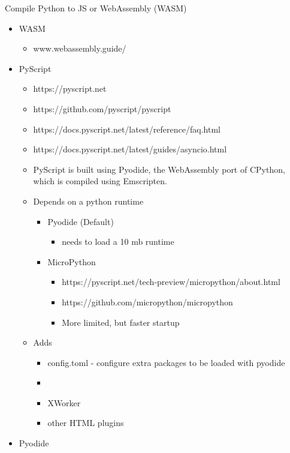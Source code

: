 Compile Python to JS or WebAssembly (WASM)

\begin{itemize}
\item
  WASM

  \begin{itemize}
  \tightlist
  \item
    www.webassembly.guide/
  \end{itemize}
\item
  PyScript

  \begin{itemize}
  \tightlist
  \item
    https://pyscript.net
  \item
    https://github.com/pyscript/pyscript
  \item
    https://docs.pyscript.net/latest/reference/faq.html
  \item
    https://docs.pyscript.net/latest/guides/asyncio.html
  \item
    PyScript is built using Pyodide, the WebAssembly port of CPython, which is compiled using Emscripten.
  \item
    Depends on a python runtime

    \begin{itemize}
    \tightlist
    \item
      Pyodide (Default)

      \begin{itemize}
      \tightlist
      \item
        needs to load a 10 mb runtime
      \end{itemize}
    \item
      MicroPython

      \begin{itemize}
      \tightlist
      \item
        https://pyscript.net/tech-preview/micropython/about.html
      \item
        https://github.com/micropython/micropython
      \item
        More limited, but faster startup
      \end{itemize}
    \end{itemize}
  \item
    Adds

    \begin{itemize}
    \item
      config.toml - configure extra packages to be loaded with pyodide
    \item
    \item
      XWorker
    \item
      other HTML plugins
    \end{itemize}
  \end{itemize}
\item
  Pyodide


\end{itemize}
